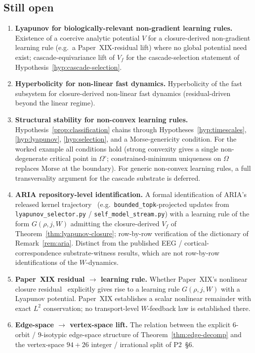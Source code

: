 \documentclass[11pt]{article}
\theoremstyle{definition}
\begin{document}
\subsection*{Still open}

\begin{enumerate}[label=\textbf{O\arabic*.}]
    \item \textbf{Lyapunov for biologically-relevant non-gradient learning rules.} Existence of a coercive analytic potential $V$ for a closure-derived non-gradient learning rule (e.g.\ a Paper~XIX-residual lift) where no global potential need exist; cascade-equivariance lift of $V_f$ for the cascade-selection statement of Hypothesis~\ref{hyp:cascade-selection}.
    \item \textbf{Hyperbolicity for non-linear fast dynamics.} Hyperbolicity of the fast subsystem for closure-derived non-linear fast dynamics (residual-driven beyond the linear regime).
    \item \textbf{Structural stability for non-convex learning rules.} Hypothesis~\ref{prop:classification} chains through Hypotheses~\ref{hyp:timescales}, \ref{hyp:lyapunov}, \ref{hyp:selection}, and a Morse-genericity condition. For the worked example all conditions hold (strong convexity gives a single non-degenerate critical point in $\Omega^\circ$; constrained-minimum uniqueness on $\Omega$ replaces Morse at the boundary). For generic non-convex learning rules, a full transversality argument for the cascade substrate is deferred.
    \item \textbf{ARIA repository-level identification.} A formal identification of ARIA's released kernel trajectory~\citep{SmartARIAChess2026} (e.g.\ \texttt{bounded\_topk}-projected updates from \texttt{lyapunov\_selector.py} / \texttt{self\_model\_stream.py}) with a learning rule of the form $G(\rho, j, W)$ admitting the closure-derived $V_f$ of Theorem~\ref{thm:lyapunov-closure}; row-by-row verification of the dictionary of Remark~\ref{rem:aria}. Distinct from the published EEG / cortical-correspondence substrate-witness results, which are not row-by-row identifications of the $W$-dynamics.
    \item \textbf{Paper~XIX residual $\to$ learning rule.} Whether Paper~XIX's nonlinear closure residual~\citep{SmartXIX} explicitly gives rise to a learning rule $G(\rho, j, W)$ with a Lyapunov potential. Paper~XIX establishes a scalar nonlinear remainder with exact $L^2$ conservation; no transport-level $W$-feedback law is established there.
    \item \textbf{Edge-space $\to$ vertex-space lift.} The relation between the explicit $6$-orbit / $9$-isotypic edge-space structure of Theorem~\ref{thm:edge-decomp} and the vertex-space $94 + 26$ integer / irrational split of P2~\S 6.
\end{enumerate}
\end{document}
